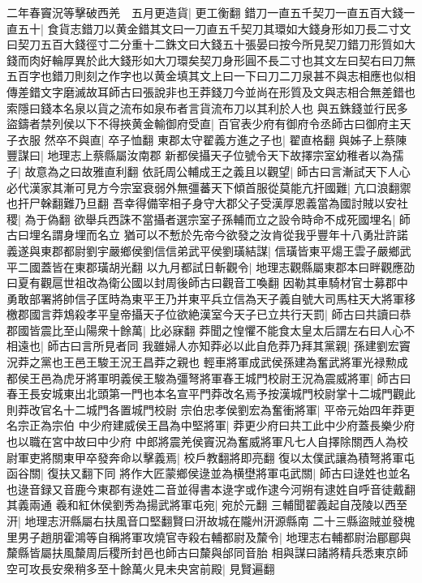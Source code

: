 二年春竇況等擊破西羌　五月更造貨|{
	更工衡翻}
錯刀一直五千契刀一直五百大錢一直五十|{
	食貨志錯刀以黄金錯其文曰一刀直五千契刀其環如大錢身形如刀長二寸文曰契刀五百大錢徑寸二分重十二銖文曰大錢五十張晏曰按今所見契刀錯刀形質如大錢而肉好輪厚異於此大錢形如大刀環矣契刀身形圓不長二寸也其文左曰契右曰刀無五百字也錯刀則刻之作字也以黄金填其文上曰一下曰刀二刀泉甚不與志相應也似相傳差錯文字磨滅故耳師古曰張說非也王莽錢刀今並尚在形質及文與志相合無差錯也索隱曰錢本名泉以貨之流布如泉布者言貨流布刀以其利於人也}
與五銖錢並行民多盜鑄者禁列侯以下不得挾黄金輸御府受直|{
	百官表少府有御府令丞師古曰御府主天子衣服}
然卒不與直|{
	卒子恤翻}
東郡太守翟義方進之子也|{
	翟直格翻}
與姊子上蔡陳豐謀曰|{
	地理志上蔡縣屬汝南郡}
新都侯攝天子位號令天下故擇宗室幼稚者以為孺子|{
	故意為之曰故雅直利翻}
依託周公輔成王之義且以觀望|{
	師古曰言漸試天下人心}
必代漢家其漸可見方今宗室衰弱外無彊蕃天下傾首服從莫能亢扞國難|{
	亢口浪翻禦也扞尸榦翻難乃旦翻}
吾幸得備宰相子身守大郡父子受漢厚恩義當為國討賊以安社稷|{
	為于偽翻}
欲舉兵西誅不當攝者選宗室子孫輔而立之設令時命不成死國埋名|{
	師古曰埋名謂身埋而名立}
猶可以不慙於先帝今欲發之汝肯從我乎豐年十八勇壯許諾義遂與東郡都尉劉宇嚴鄉侯劉信信弟武平侯劉璜結謀|{
	信璜皆東平煬王雲子嚴鄉武平二國蓋皆在東郡璜胡光翻}
以九月都試日斬觀令|{
	地理志觀縣屬東郡本曰畔觀應劭曰夏有觀扈世祖改為衛公國以封周後師古曰觀音工喚翻}
因勒其車騎材官士募郡中勇敢部署將帥信子匡時為東平王乃并東平兵立信為天子義自號大司馬柱天大將軍移檄郡國言莽鴆殺孝平皇帝攝天子位欲絶漢室今天子已立共行天罰|{
	師古曰共讀曰恭}
郡國皆震比至山陽衆十餘萬|{
	比必寐翻}
莽聞之惶懼不能食太皇太后謂左右曰人心不相遠也|{
	師古曰言所見者同}
我雖婦人亦知莽必以此自危莽乃拜其黨親|{
	孫建劉宏竇況莽之黨也王邑王駿王況王昌莽之親也}
輕車將軍成武侯孫建為奮武將軍光禄勲成都侯王邑為虎牙將軍明義侯王駿為彊弩將軍春王城門校尉王況為震威將軍|{
	師古曰春王長安城東出北頭第一門也本名宣平門莽改名焉予按漢城門校尉掌十二城門觀此則莽改官名十二城門各置城門校尉}
宗伯忠孝侯劉宏為奮衝將軍|{
	平帝元始四年莽更名宗正為宗伯}
中少府建威侯王昌為中堅將軍|{
	莽更少府曰共工此中少府蓋長樂少府也以職在宮中故曰中少府}
中郎將震羌侯竇況為奮威將軍凡七人自擇除關西人為校尉軍吏將關東甲卒發奔命以擊義焉|{
	校戶教翻將即亮翻}
復以太僕武讓為積弩將軍屯函谷關|{
	復扶又翻下同}
將作大匠蒙鄉侯逯並為横壄將軍屯武關|{
	師古曰逯姓也並名也逯音録又音鹿今東郡有逯姓二音並得書本逯字或作逮今河朔有逮姓自呼音徒戴翻其義兩通}
羲和紅休侯劉秀為揚武將軍屯宛|{
	宛於元翻}
三輔聞翟義起自茂陵以西至汧|{
	地理志汧縣屬右扶風音口堅翻賢曰汧故城在隴州汧源縣南}
二十三縣盜賊並發槐里男子趙朋霍鴻等自稱將軍攻燒官寺殺右輔都尉及斄令|{
	地理志右輔都尉治郿郿與斄縣皆屬扶風斄周后稷所封邑也師古曰斄與邰同音胎}
相與謀曰諸將精兵悉東京師空可攻長安衆稍多至十餘萬火見未央宮前殿|{
	見賢遍翻}
